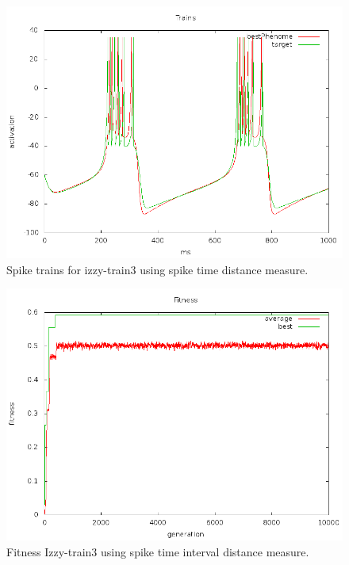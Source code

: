 \documentclass[a4paper]{article}
\begin{document}
\begin{figure}[htb!]
  \centering
  \includegraphics[width=\textwidth]{SpikeTime-izzy3-trains-plot.png}
  \caption{Spike trains for izzy-train3 using spike time distance measure.}
\end{figure}

\newpage

\begin{figure}[htb!]
  \centering
  \includegraphics[width=\textwidth]{SpikeInterval-izzy3-fitness-plot.png}
  \caption{Fitness Izzy-train3 using spike time interval distance measure.}
\end{figure}
\end{document}
